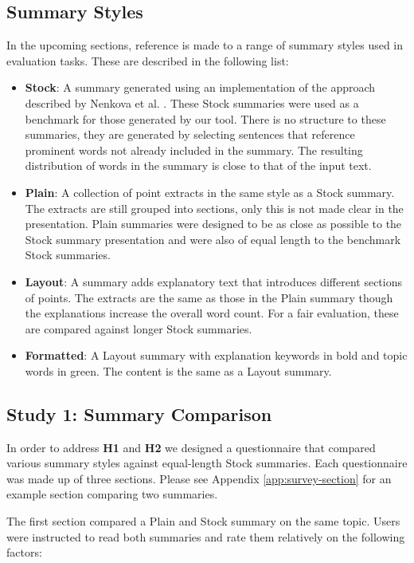     \tocless\subsection{Summary Styles}
      In the upcoming sections, reference is made to a range of summary styles used in evaluation tasks. These are described in the following list:
      \begin{itemize}
        \item{\textbf{Stock}: A summary generated using an implementation of the approach described by Nenkova et al. \cite{nenkova2006compositional}. These Stock summaries were used as a benchmark for those generated by our tool. There is no structure to these summaries, they are generated by selecting sentences that reference prominent words not already included in the summary. The resulting distribution of words in the summary is close to that of the input text.}
        \item{\textbf{Plain}: A collection of point extracts in the same style as a Stock summary. The extracts are still grouped into sections, only this is not made clear in the presentation. Plain summaries were designed to be as close as possible to the Stock summary presentation and were also of equal length to the benchmark Stock summaries.}
        \item{\textbf{Layout}: A summary adds explanatory text that introduces different sections of points. The extracts are the same as those in the Plain summary though the explanations increase the overall word count. For a fair evaluation, these are compared against longer Stock summaries.}
        \item{\textbf{Formatted}: A Layout summary with explanation keywords in bold and topic words in green. The content is the same as a Layout summary.}
      \end{itemize}

    \tocless\subsection{Study 1: Summary Comparison\label{sec:stud1}}
      In order to address \textbf{H1} and \textbf{H2} we designed a questionnaire that compared various summary styles against equal-length Stock summaries. Each questionnaire was made up of three sections. Please see Appendix \ref{app:survey-section} for an example section comparing two summaries.

      The first section compared a Plain and Stock summary on the same topic. Users were instructed to read both summaries and rate them relatively on the following factors:

